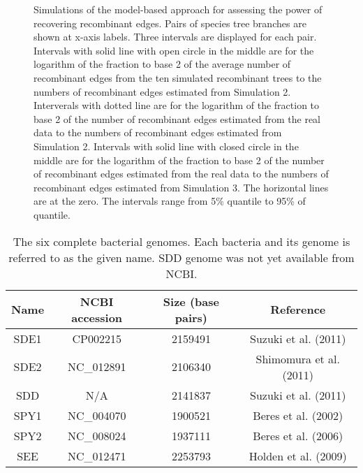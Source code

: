 \documentclass[10pt]{article}
\providecommand{\tabularnewline}{\\}
\begin{document}
\begin{figure}



\caption{\label{fig:h3}
Simulations of the model-based approach for assessing the power of recovering
recombinant edges. Pairs of species tree branches are shown at x-axis labels.
Three intervals are displayed for each pair. Intervals with solid line with open
circle in the middle are for the logarithm of the fraction to base 2 of the average
number of recombinant edges from the ten simulated recombinant trees 
to the numbers of recombinant edges estimated from Simulation 2. 
Interverals with dotted line are for the logarithm of the fraction to base 2 of
the number of recombinant edges estimated from the real data
to the numbers of recombinant edges estimated from Simulation 2.
Intervals with solid line with closed circle in the middle are for the logarithm
of the fraction to base 2 of the number of recombinant edges estimated from the real data
to the numbers of recombinant edges estimated from Simulation 3. 
The horizontal lines are at the zero.
The intervals range from 5\% quantile to 95\% of quantile.}
\end{figure}
\clearpage{}%

\clearpage{}\setcounter{figure}{0}
\setcounter{table}{0}
\renewcommand{\figurename}{Supplementary Figure}
\renewcommand{\tablename}{Supplementary Table}


\begin{table}
\caption{\label{tab:genome}The six complete bacterial genomes. 
Each bacteria and its genome is referred to as the given name.
SDD genome was not yet available from NCBI.}
\noindent \begin{centering}
\begin{tabular}{cccc}
\hline 
Name & NCBI accession & Size (base pairs) & Reference\tabularnewline
\hline
SDE1 & CP002215 & 2159491 & Suzuki et al. (2011)\tabularnewline
SDE2 & NC\_012891 & 2106340 & Shimomura et al. (2011)\tabularnewline
SDD & N/A & 2141837 & Suzuki et al. (2011)\tabularnewline
SPY1 & NC\_004070 & 1900521 & Beres et al. (2002)\tabularnewline
SPY2 & NC\_008024 & 1937111 & Beres et al. (2006)\tabularnewline
SEE & NC\_012471 & 2253793 & Holden et al. (2009)\tabularnewline
\hline
\end{tabular}
\par\end{centering}
\end{table}
\end{document}
